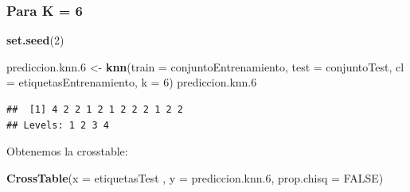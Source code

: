 \documentclass[]{article}
\newenvironment{Shaded}{\begin{snugshade}}{\end{snugshade}}
\newcommand{\KeywordTok}[1]{\textcolor[rgb]{0.13,0.29,0.53}{\textbf{#1}}}
\newcommand{\DataTypeTok}[1]{\textcolor[rgb]{0.13,0.29,0.53}{#1}}
\newcommand{\DecValTok}[1]{\textcolor[rgb]{0.00,0.00,0.81}{#1}}
\newcommand{\StringTok}[1]{\textcolor[rgb]{0.31,0.60,0.02}{#1}}
\newcommand{\OtherTok}[1]{\textcolor[rgb]{0.56,0.35,0.01}{#1}}
\newcommand{\NormalTok}[1]{#1}
\begin{document}
\subsubsection{Para K = 6}\label{para-k-6}

\begin{Shaded}
\begin{Highlighting}[]
\KeywordTok{set.seed}\NormalTok{(}\DecValTok{2}\NormalTok{)}

\NormalTok{prediccion.knn.}\DecValTok{6}\NormalTok{ <-}\StringTok{ }\KeywordTok{knn}\NormalTok{(}\DataTypeTok{train =}\NormalTok{ conjuntoEntrenamiento, }\DataTypeTok{test =}\NormalTok{ conjuntoTest, }\DataTypeTok{cl =}\NormalTok{ etiquetasEntrenamiento, }\DataTypeTok{k =} \DecValTok{6}\NormalTok{)}
\NormalTok{prediccion.knn.}\DecValTok{6}
\end{Highlighting}
\end{Shaded}

\begin{verbatim}
##  [1] 4 2 2 1 2 1 2 2 2 1 2 2
## Levels: 1 2 3 4
\end{verbatim}

Obtenemos la crosstable:

\begin{Shaded}
\begin{Highlighting}[]
\KeywordTok{CrossTable}\NormalTok{(}\DataTypeTok{x =}\NormalTok{ etiquetasTest , }\DataTypeTok{y =}\NormalTok{ prediccion.knn.}\DecValTok{6}\NormalTok{, }\DataTypeTok{prop.chisq =} \OtherTok{FALSE}\NormalTok{)}
\end{Highlighting}
\end{Shaded}
\end{document}
